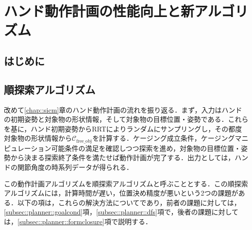 \documentclass[a4paper,twoside,12pt,papersize, dvipdfmx]{iirthesis}
\begin{document}
    \newcommand{\figref}[1]{\figurename\ref{#1}}
    \newcommand{\tabref}[1]{\tablename\ref{#1}}
    \renewcommand{\eqref}[1]{式~(\ref{#1})}
    \newcommand{\chapref}[1]{\ref{#1}章}
    \newcommand{\secref}[1]{\ref{#1}節}
    \newcommand{\ssecref}[1]{\ref{#1}項}
    \newcommand{\appref}[1]{付録\ref{#1}}
    \newcommand{\algoref}[1]{Algorithm.\ref{#1}}
\fi


\chapter{ハンド動作計画の性能向上と新アルゴリズム}\label{chap::planner}
\minitoc

\section{はじめに}\label{sec::planner::intro}

\section{順探索アルゴリズム}\label{sec::planner::straight}
改めて\chapref{chap::sicm}のハンド動作計画の流れを振り返る．まず，入力はハンドの初期姿勢と対象物の形状情報，そして対象物の目標位置・姿勢である．これらを基に，ハンド初期姿勢からRRTによりランダムにサンプリングし，その都度対象物の形状情報から$\mathcal{C}_{\mathrm{free\_obj}}$を計算する．ケージング成立条件，ケージングマニピュレーション可能条件の満足を確認しつつ探索を進め，対象物の目標位置・姿勢から決まる探索終了条件を満たせば動作計画が完了する．出力としては，ハンドの関節角度の時系列データが得られる．\par
この動作計画アルゴリズムを順探索アルゴリズムと呼ぶこととする．この順探索アルゴリズムには，計算時間が遅い，位置決め精度が悪いという2つの課題がある．以下の項は，これらの解決方法についてであり，前者の課題に対しては，\ssecref{subsec::planner::goalcond}，\ssecref{subsec::planner::dfs}で，後者の課題に対しては，\ssecref{subsec::planner::formclosure}で説明する．
\end{document}
